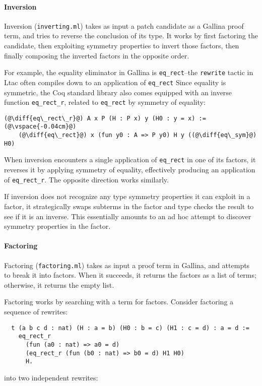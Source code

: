 \paragraph{Inversion} Inversion (\lstinline{inverting.ml}) takes as input a patch candidate as a Gallina proof term,
and tries to reverse the conclusion of its type.
It works by first factoring the candidate,
then exploiting symmetry properties to invert those factors,
then finally composing the inverted factors in the opposite order.

For example, the equality eliminator in Gallina is \lstinline{eq_rect}--the \lstinline{rewrite} tactic in Ltac
often compiles down to an application of \lstinline{eq_rect} %
Since equality is symmetric, the Coq standard library also comes equipped with an inverse function \lstinline{eq_rect_r},
related to \lstinline{eq_rect} by symmetry of equality:

\begin{lstlisting}[language=coq]
  (@\diff{eq\_rect\_r}@) A x P (H : P x) y (H0 : y = x) :=(@\vspace{-0.04cm}@)
    (@\diff{eq\_rect}@) x (fun y0 : A => P y0) H y ((@\diff{eq\_sym}@) H0)	
\end{lstlisting} %
When inversion encounters a single application of \lstinline{eq_rect} in one of its factors,
it reverses it by applying symmetry of equality, effectively producing an application of \lstinline{eq_rect_r}.
The opposite direction works similarly.

If inversion does not recognize any type symmetry properties it can exploit in a factor, it
strategically swaps subterms in the factor and type checks the result to see if it is an inverse.
This essentially amounts to an ad hoc attempt to discover symmetry properties in the factor.

\paragraph{Factoring} Factoring (\lstinline{factoring.ml}) takes as input a proof term in Gallina,
and attempts to break it into factors.
When it succeeds, it returns the factors as a list of terms;
otherwise, it returns the empty list.

Factoring works by searching with a term for factors.
Consider factoring a sequence of rewrites:
\begin{lstlisting}
  t (a b c d : nat) (H : a = b) (H0 : b = c) (H1 : c = d) : a = d :=
    eq_rect_r
      (fun (a0 : nat) => a0 = d)
      (eq_rect_r (fun (b0 : nat) => b0 = d) H1 H0)
      H.
\end{lstlisting}
into two independent rewrites:

